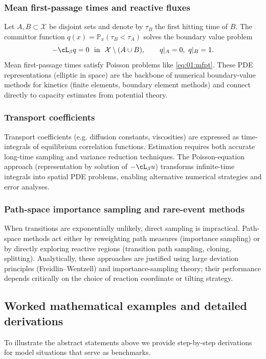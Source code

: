 \subsubsection*{Mean first-passage times and reactive fluxes}
Let $A,B\subset\mathcal X$ be disjoint sets and denote by $\tau_B$ the first hitting time of $B$. The committor function $q(x)=\mathbb P_x(\tau_B<\tau_A)$
solves the boundary value problem
\[
-\cL_\beta q = 0 \ \text{ in }\ \mathcal X\setminus(A\cup B),\qquad q|_A=0,\ q|_B=1.
\]
Mean first-passage times satisfy Poisson problems like \eqref{eq:01:mfpt}. These PDE representations (elliptic in space) are the backbone of numerical boundary-value
methods for kinetics (finite elements, boundary element methods) and connect directly to capacity estimates from potential theory.

\subsubsection*{Transport coefficients}
Transport coefficients (e.g. diffusion constants, viscosities) are expressed as time-integrals of equilibrium correlation functions. Estimation requires both accurate long-time sampling and variance reduction techniques. The Poisson-equation approach (representation by solution of $-\cL_\beta u$) transforms infinite-time integrals into spatial PDE problems, enabling alternative numerical strategies and error analyses.

\subsubsection*{Path-space importance sampling and rare-event methods}
When transitions are exponentially unlikely, direct sampling is impractical. Path-space methods act either by reweighting path measures (importance sampling) or by directly exploring reactive regions (transition path sampling, cloning, splitting). Analytically, these approaches are justified using large deviation principles (Freidlin--Wentzell) and importance-sampling theory; their performance depends critically on the choice of reaction coordinate or tilting strategy.

\subsection{Worked mathematical examples and detailed derivations}

To illustrate the abstract statements above we provide step-by-step derivations for model situations that serve as benchmarks.

